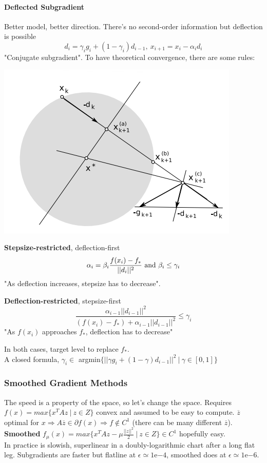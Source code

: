 \documentclass[10pt]{report}
\begin{document}
\paragraph{Deflected Subgradient} Better model, better direction. There's no second-order information but deflection is possible $$d_i = \gamma_ig_i+(1-\gamma_i)d_{i-1},\:x_{i+1}=x_i-\alpha_id_i$$ "Conjugate subgradient". To have theoretical convergence, there are some rules:
\begin{multicols}{2}
\begin{center}
	\includegraphics[scale=0.66]{8.png}
\end{center}
\columnbreak
\begin{list}{}{}
	\item \textbf{Stepsize-restricted}, deflection-first\\
	$$\alpha_i = \beta_i\frac{f(x_i)-f_*}{||d_i||^2}\hbox{ and }\beta_i\leq\gamma_i$$
	"As deflection increases, stepsize has to decrease".
	\item \textbf{Deflection-restricted}, stepsize-first\\
	$$\frac{\alpha_{i-1}||d_{i-1}||^2}{(f(x_i)-f_*)+\alpha_{i-1}||d_{i-1}||^2}\leq \gamma_i$$
	"As $f(x_i)$ approaches $f_*$, deflection has to decrease"
\end{list}
\end{multicols}
In both cases, target level to replace $f_*$.\\
A closed formula, $\gamma_i\in$ argmin$\{||\gamma g_i+(1-\gamma)d_{i-1}||^2\:|\:\gamma\in[0,1]\}$
\subsubsection{Smoothed Gradient Methods} The speed is a property of the space, so let's change the space. Requires $f(x) = max\{x^TAz\:|\:z\in Z\}$ convex and assumed to be easy to compute. $\overline{z}$ optimal for $x\Rightarrow A\overline{z}\in\partial f(x)\Rightarrow f\not\in C^1$ (there can be many different $\overline{z}$).\\
\textbf{Smoothed} $f_\mu(x)=max\{x^TAz-\mu\frac{||z||^2}{2}\:|\:z\in Z\}\in C^1$ hopefully easy.\\
In practice is slowish, superlinear in a doubly-logarithmic chart after a long flat leg. Subgradients are faster but flatline at $\epsilon\simeq 1$e$-4$, smoothed does at $\epsilon\simeq 1$e$-6$.
\end{document}
